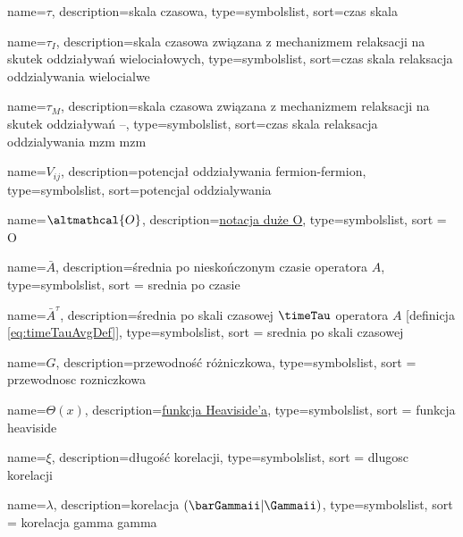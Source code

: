 {
    name=\ensuremath{\tau},
    description={skala czasowa},
    type=symbolslist,
    sort=czas skala
}

{
    name=\ensuremath{\tau_{I}},
    description={skala czasowa związana z mechanizmem relaksacji na skutek oddziaływań wielociałowych},
    type=symbolslist,
    sort=czas skala relaksacja oddzialywania wielocialwe
}

{
    name=\ensuremath{\tau_{M}},
    description={skala czasowa związana z mechanizmem relaksacji na skutek oddziaływań \MZM--\MZM},
    type=symbolslist,
    sort=czas skala relaksacja oddzialywania mzm mzm
}

{
    name=\ensuremath{V_{ij}},
    description={potencjał oddziaływania fermion-fermion},
    type=symbolslist,
    sort=potencjal oddzialywania
}

{
    name=\ensuremath{\altmathcal{O}},
    description={\href{https://pl.wikipedia.org/wiki/Asymptotyczne_tempo_wzrostu}{notacja duże O}},
    type=symbolslist,
    sort = O
}

{
    name=\ensuremath{\bar A},
    description={średnia po nieskończonym czasie operatora $A$},
    type=symbolslist,
    sort = srednia po czasie
}


{
    name=\ensuremath{\bar A^{\tau}},
    description={średnia po skali czasowej $\timeTau$ operatora $A$ [definicja \eqref{eq:timeTauAvgDef}]},
    type=symbolslist,
    sort = srednia po skali czasowej
}

{
    name=\ensuremath{G},
    description={przewodność różniczkowa},
    type=symbolslist,
    sort = przewodnosc rozniczkowa
}


{
    name=\ensuremath{\Theta(x)},
    description={\href{https://pl.wikipedia.org/wiki/Funkcja_skokowa_Heaviside\%E2\%80\%99a}{funkcja Heaviside'a}},
    type=symbolslist,
    sort = funkcja heaviside
}

{
    name=\ensuremath{\xi},
    description={długość korelacji},
    type=symbolslist,
    sort = dlugosc korelacji
}

{
    name=\ensuremath{\lambda},
    description={korelacja $(\barGammaii|\Gammaii)$},
    type=symbolslist,
    sort = korelacja gamma gamma
}

